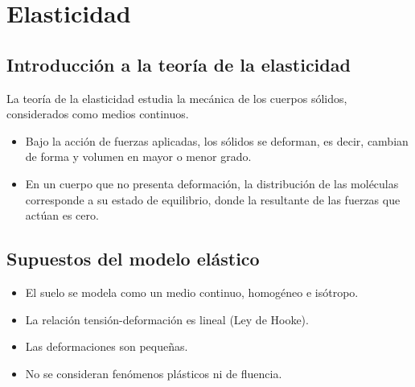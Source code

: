 \documentclass{article} %
\begin{document}

\newpage

\setcounter{page}{1} %
\section{Elasticidad}

\subsection*{Introducción a la teoría de la elasticidad}

La teoría de la elasticidad estudia la mecánica de los cuerpos sólidos, considerados como medios continuos.

\begin{itemize}
    \item Bajo la acción de fuerzas aplicadas, los sólidos se deforman, es decir, cambian de forma y volumen en mayor o menor grado.
    \item En un cuerpo que no presenta deformación, la distribución de las moléculas corresponde a su estado de equilibrio, donde la resultante de las fuerzas que actúan es cero.
\end{itemize}

\subsection*{Supuestos del modelo elástico}
\begin{itemize}
    \item El suelo se modela como un medio continuo, homogéneo e isótropo.
    \item La relación tensión-deformación es lineal (Ley de Hooke).
    \item Las deformaciones son pequeñas.
    \item No se consideran fenómenos plásticos ni de fluencia.
\end{itemize}
\end{document}
